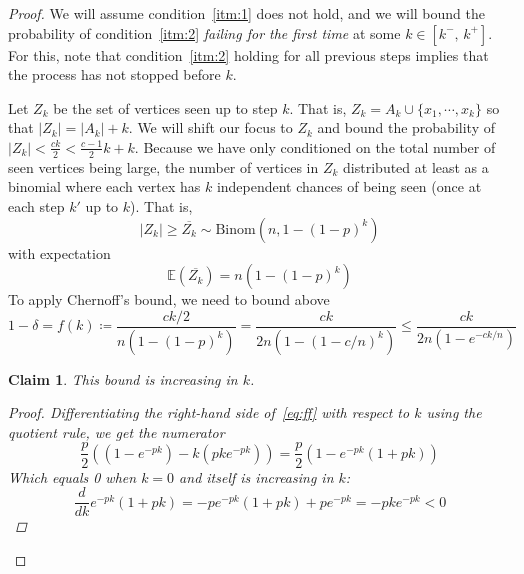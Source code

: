 \documentclass{amsart}
\theoremstyle{plain}
\newtheorem*{claim}{\textbf{Claim}}
\theoremstyle{definition}
\begin{document}
    \begin{proof}
        \vspace{-3mm}
        We will assume condition~\eqref{itm:1} does not hold, and we will bound the probability of
        condition~\eqref{itm:2} \emph{failing for the first time} at some $k \in [k^{-}, \, k^{+}]$.
        For this, note that condition~\eqref{itm:2} holding for all previous steps implies that
        the process has not stopped before $k$.

        \noindent Let $Z_k$ be the set of vertices seen up to step $k$.
        That is, $Z_k = A_k \cup \{x_1, \cdots, x_k\}$ so that $|Z_k| = |A_k| + k$.
        We will shift our focus to $Z_k$ and bound the probability of $|Z_k| < \frac{ck}{2} < \frac{c-1}{2}k + k$.
        Because we have only conditioned on the total number of seen vertices being large,
        the number of vertices in $Z_k$ distributed at least as a binomial
        where each vertex has $k$ independent chances of being seen (once at each step $k'$ up to $k$).
        That is,
        \begin{equation}
            |Z_k| \geq \overline{Z_k} \sim \text{Binom}\left(n, 1 - (1 - p)^k\right)
            \label{eq:binom}
        \end{equation}
        with expectation
        \begin{equation}
            \mathbb{E}\left(\overline{Z_k}\right) = n\left(1 - (1 - p)^k\right)
            \label{eq:expec}
        \end{equation}
    To apply Chernoff's bound, we need to bound above
    \begin{equation}
        1 - \delta = f(k) \coloneqq \frac{ck/2}{n\left(1 - (1 - p)^k\right)} =
        \frac{ck}{2n\left(1 - (1 - c/n)^k\right)} \leq \frac{ck}{2n\left(1 - e^{-ck/n}\right)}
        \label{eq:ff}
    \end{equation}
    \begin{claim}
        This bound is increasing in $k$.

        \begin{proof}
            Differentiating the right-hand side of~\eqref{eq:ff} with respect to $k$ using the quotient rule, we get
            the numerator
            \begin{equation}
                \frac{p}{2}\left(\left(1 - e^{-pk}\right) - k\left(pke^{-pk}\right)\right) = \frac{p}{2}\left(1 - e^{-pk}\left(1 + pk\right)\right)
                \label{eq:diff_num}
            \end{equation}
            Which equals 0 when $k=0$ and itself is increasing in $k$:
            \begin{equation}
                \frac{d}{dk}e^{-pk}\left(1 + pk\right) = -p e^{-pk} \left(1 + pk\right) + p e^{-pk} = -pk e^{-pk} < 0
                \label{eq:diff_num2}
            \end{equation}
        \end{proof}
        

\end{claim}
\end{proof}
\end{document}
